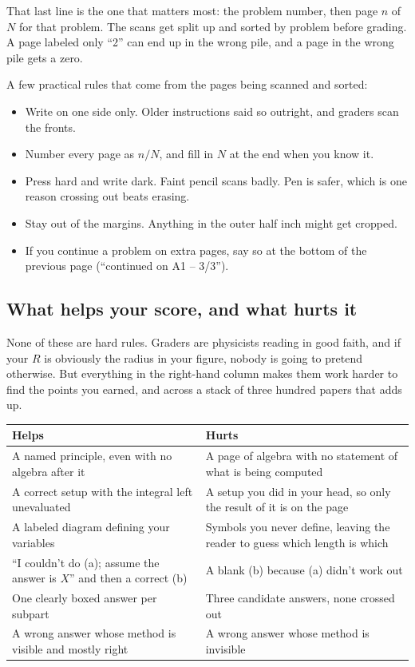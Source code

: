 \documentclass[11pt]{article}
\begin{document}
That last line is the one that matters most: the problem number, then page $n$ of $N$ for
that problem. The scans get split up and sorted by problem before grading. A page labeled
only ``2'' can end up in the wrong pile, and a page in the wrong pile gets a zero.

\begin{warnbox}
A few practical rules that come from the pages being scanned and sorted:
\begin{itemize}\setlength{\itemsep}{1pt}
\item Write on one side only. Older instructions said so outright, and graders scan the
fronts.
\item Number every page as $n/N$, and fill in $N$ at the end when you know it.
\item Press hard and write dark. Faint pencil scans badly. Pen is safer, which is one reason
crossing out beats erasing.
\item Stay out of the margins. Anything in the outer half inch might get cropped.
\item If you continue a problem on extra pages, say so at the bottom of the previous page
(``continued on A1 -- 3/3'').
\end{itemize}
\end{warnbox}

\subsection*{What helps your score, and what hurts it}

None of these are hard rules. Graders are physicists reading in good faith, and if your $R$
is obviously the radius in your figure, nobody is going to pretend otherwise. But everything
in the right-hand column makes them work harder to find the points you earned, and across a
stack of three hundred papers that adds up.

\begin{center}
\begin{tabular}{p{}p{}}
\hline
\textbf{Helps} & \textbf{Hurts} \\
\hline
A named principle, even with no algebra after it &
A page of algebra with no statement of what is being computed \\[3pt]
A correct setup with the integral left unevaluated &
A setup you did in your head, so only the result of it is on the page \\[3pt]
A labeled diagram defining your variables &
Symbols you never define, leaving the reader to guess which length is which \\[3pt]
``I couldn't do (a); assume the answer is $X$'' and then a correct (b) &
A blank (b) because (a) didn't work out \\[3pt]
One clearly boxed answer per subpart &
Three candidate answers, none crossed out \\[3pt]
A wrong answer whose method is visible and mostly right &
A wrong answer whose method is invisible \\
\hline
\end{tabular}
\end{center}
\end{document}
